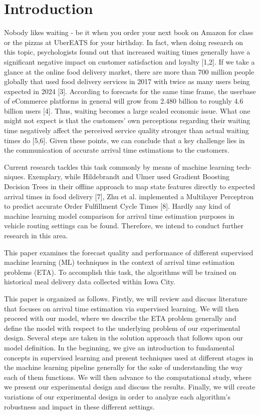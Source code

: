 \chapter{Introduction}

Nobody likes waiting - be it when you order your next book on Amazon for class or the pizzas at UberEATS for your birthday. In fact, when doing research on this topic, psychologists found out that increased waiting times generally have a significant negative impact on customer satisfaction and loyalty [1,2]. If we take a glance at the online food delivery market, there are more than 700 million people globally that used food delivery services in 2017 with twice as many users being expected in 2024 [3]. According to forecasts for the same time frame, the userbase of eCommerce platforms in general will grow from 2.480 billion to roughly 4.6 billion users [4]. Thus, waiting becomes a large scaled economic issue. What one might not expect is that the customers’ own perceptions regarding their waiting time negatively affect the perceived service quality stronger than actual waiting times do [5,6]. Given these points, we can conclude that a key challenge lies in the communication of accurate arrival time estimations to the customers. 

Current research tackles this task commonly by means of machine learning tech-niques. Exemplary, while Hildebrandt and Ulmer used Gradient Boosting Decision Trees in their offline approach to map state features directly to expected arrival times in food delivery [7], Zhu et al. implemented a Multilayer Perceptron to predict accurate Order Fulfillment Cycle Times [8]. Hardly any kind of machine learning model comparison for arrival time estimation purposes in vehicle routing settings can be found. Therefore, we intend to conduct further research in this area.  

This paper examines the forecast quality and performance of different supervised machine learning (ML) techniques in the context of arrival time estimation problems (ETA). To accomplish this task, the algorithms will be trained on historical meal delivery data collected within Iowa City. 

This paper is organized as follows. Firstly, we will review and discuss literature that focuses on arrival time estimation via supervised learning. We will then proceed with our model, where we describe the ETA problem generally and define the model with respect to the underlying problem of our experimental design. Several steps are taken in the solution approach that follows upon our model definition. In the beginning, we give an introduction to fundamental concepts in supervised learning and present techniques used at different stages in the machine learning pipeline generally for the sake of understanding the way each of them functions. We will then advance to the computational study, where we present our experimental design and discuss the results. Finally, we will create variations of our experimental design in order to analyze each algorithm’s robustness and impact in these different settings.